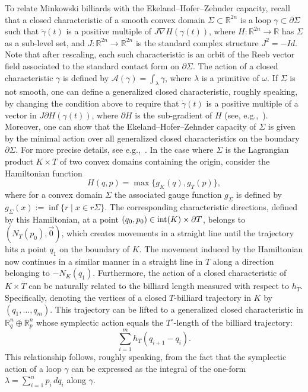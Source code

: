 \documentclass[10pt,a4paper]{article}
\theoremstyle{definition}
\newcommand{\R}{{\mathbb{R}}}
\newcommand{\dg}{\dot{\gamma}}
\begin{document}
\medskip


To relate Minkowski billiards with the Ekeland--Hofer--Zehnder capacity, recall that a closed characteristic of a smooth convex domain $\Sigma \subset {\mathbb R}^{2n}$ is a loop $\gamma \subset \partial\Sigma$ such that $\dg(t)$ is a positive multiple of $J \nabla H(\gamma(t))$, where $H: \R^{2n} \to \R$ has $\Sigma$ as a sub-level set, and $J :\mathbb R^{2n} \rightarrow {\mathbb R}^{2n} $ is the standard complex structure $J^2 = -Id$.
Note that after rescaling, each such characteristic is an orbit of the Reeb vector field associated to the standard contact form on $\partial \Sigma$.
The action of a closed characteristic $\gamma$ is defined by ${\mathcal A}(\gamma) = \int_{\lambda} \gamma$, where $\lambda$ is a primitive of $\omega$. 
If $\Sigma$ is not smooth, one can define a generalized closed characteristic, roughly speaking, by changing the condition above to require that $\dg(t)$ is a positive multiple of a vector in $ J \partial H(\gamma(t))$, where $\partial H$ is the sub-gradient of $H$ (see, e.g.,~\cite{ Kunzle}).  Moreover, one can show  that the Ekeland--Hofer--Zehnder capacity of $\Sigma$ is given by 
 the minimal action over all generalized closed characteristics on the boundary $\partial \Sigma$. 
 For more precise details, see e.g.,~\cite{AA-O, Kunzle}. In the case where \(\Sigma\) is the Lagrangian product \(K \times T\) of two convex domains containing the origin, consider the Hamiltonian function
$$ H(q,p) = \max \{ g_K(q), g_T(p) \}, $$
where for a convex domain $\Sigma$ the  associated gauge function $g_{\Sigma}$ is defined by 
$ g_{\Sigma}(x) := \inf \{ r \mid x \in r \Sigma \}
$. 
The corresponding characteristic directions, defined by this Hamiltonian, at a point $(q_0,p_0) \in {\rm int}(K) \times \partial T$, belongs to $(N_T(p_0),\vec{0})$, which creates movements in a straight line until the trajectory hits a point $q_1$ on the boundary of $K$.
The movement induced by the Hamiltonian now continues in a similar manner in a straight line in $T$ along a direction belonging to $-N_K(q_1)$.
Furthermore, the action of a closed characteristic of \(K \times T\) can be naturally related to the billiard length measured with respect to \(h_T\). Specifically, denoting the vertices of a closed \(T\)-billiard trajectory in \(K\) by \((q_1, \ldots, q_m)\). This trajectory can be lifted to a generalized closed characteristic in ${\mathbb R}^n_q \oplus {\mathbb R}^n_p$ whose symplectic action equals the \(T^\circ\)-length of the billiard trajectory:
\[
\sum_{i=1}^{m} h_T(q_{i+1} - q_i).
\]
This relationship follows, roughly speaking, from the fact that the symplectic action of a loop \(\gamma\) can be expressed as the integral of the one-form \(\lambda = \sum_{i=1}^n p_i \, dq_i\) along  $\gamma$. 
\end{document}
